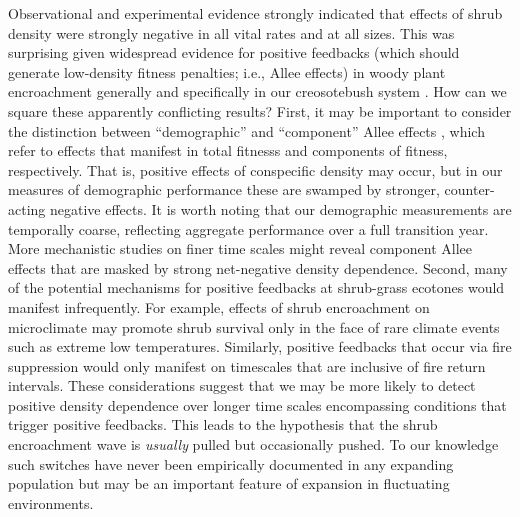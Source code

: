 \documentclass[11pt]{article}\usepackage[]{graphicx}\usepackage[usenames,dvipsnames]{xcolor}
\begin{document}
Observational and experimental evidence strongly indicated that effects of shrub density were strongly negative in all vital rates and at all sizes.
This was surprising given widespread evidence for positive feedbacks (which should generate low-density fitness penalties; i.e., Allee effects) in woody plant encroachment generally \citep{d2013vegetation} and specifically in our creosotebush system \citep{d2010positive}. 
How can we square these apparently conflicting results?
First, it may be important to consider the distinction between ``demographic'' and ``component'' Allee effects \citep{stephens1999allee}, which refer to effects that manifest in total fitnesss and components of fitness, respectively. 
That is, positive effects of conspecific density may occur, but in our measures of demographic performance these are swamped by stronger, counter-acting negative effects.
It is worth noting that our demographic measurements are temporally coarse, reflecting aggregate performance over a full transition year.
More mechanistic studies on finer time scales might reveal component Allee effects that are masked by strong net-negative density dependence. 
Second, many of the potential mechanisms for positive feedbacks at shrub-grass ecotones would manifest infrequently. 
For example, effects of shrub encroachment on microclimate \citep{d2013vegetation} may promote shrub survival only in the face of rare climate events such as extreme low temperatures.
Similarly, positive feedbacks that occur via fire suppression \citep{ratajczak2011positive,collins2021fire} would only manifest on timescales that are inclusive of fire return intervals. 
These considerations suggest that we may be more likely to detect positive density dependence over longer time scales encompassing conditions that trigger positive feedbacks. 
This leads to the hypothesis that the shrub encroachment wave is \emph{usually} pulled but occasionally pushed.
To our knowledge such switches have never been empirically documented in any expanding population but may be an important feature of expansion in fluctuating environments. 
\end{document}
